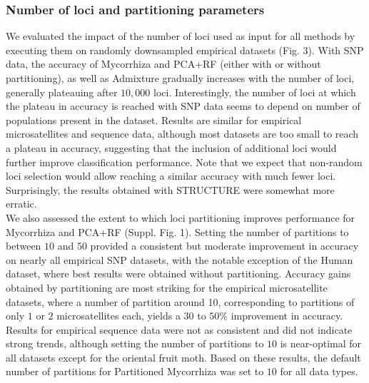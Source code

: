 \documentclass[final]{bioinfo}
\begin{document}
\subsubsection{Number of loci  and partitioning parameters}
We evaluated the impact of the number of loci used as input for all methods by executing them on randomly downsampled empirical datasets (Fig. 3). With SNP data, the accuracy of Mycorrhiza and PCA+RF (either with or without partitioning), as well as Admixture gradually increases with the number of loci, generally plateauing after $10,000$ loci. Interestingly, the number of loci at which the plateau in accuracy is reached with SNP data seems to depend on number of populations present in the dataset.
Results are similar for empirical microsatellites and sequence data, although most datasets are too small to reach a plateau in accuracy, suggesting that the inclusion of additional loci would further improve classification performance. Note that we expect that non-random loci selection would allow reaching a similar accuracy with much fewer loci. Surprisingly, the results obtained with STRUCTURE were somewhat more erratic.\\
We also assessed the extent to which loci partitioning improves performance for Mycorrhiza and PCA+RF (Suppl. Fig. 1). Setting the number of partitions to between $10$ and $50$ provided a consistent but moderate improvement in accuracy on nearly all empirical SNP datasets, with the notable exception of the Human dataset, where best results were obtained without partitioning. Accuracy gains obtained by partitioning are most striking for the empirical microsatellite datasets, where a number of partition around 10, corresponding to partitions of only $1$ or $2$ microsatellites each, yields a $30$ to $50\%$ improvement in accuracy. Results for empirical sequence data were not as consistent and did not indicate strong trends, although setting the number of partitions to $10$ is near-optimal for all datasets except for the oriental fruit moth. Based on these results, the default number of partitions for Partitioned Mycorrhiza was set to $10$ for all data types.
\end{document}
